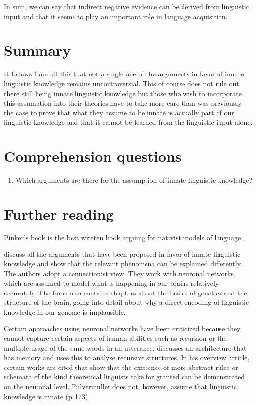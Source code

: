 In sum, we can say that indirect negative evidence can be derived from linguistic input and that it
seems to play an important role in language acquisition.
% 

\section{Summary}

It follows from all this that not a single one of the arguments in favor of innate linguistic knowledge remains uncontroversial.
This of course does not rule out there still being innate linguistic knowledge but those who wish to incorporate
this assumption into their theories have to take more care than was previously the case to prove that what they assume to be innate
is actually part of our linguistic knowledge and that it cannot be learned from the linguistic input alone.%
%


\section*{Comprehension questions}

\begin{enumerate}
\item Which arguments are there for the assumption of innate linguistic knowledge?
\end{enumerate} 


\section*{Further reading}

Pinker's book \citeyearpar{Pinker94a} is the best written book arguing for nativist models of language.

\citet*{EBJKSPP96a} discuss all the arguments that have been proposed in favor of innate linguistic knowledge and show
that the relevant phenomena can be explained differently. The authors adopt a connectionist view. They work with neuronal
networks, which are assumed to model what is happening in our brains relatively accurately.
The book also contains chapters about the basics of genetics and the structure of the brain, going into detail about why
a direct encoding of linguistic knowledge in our genome is implausible. 

Certain approaches using neuronal networks have been criticized because they cannot capture certain aspects of human abilities
such as recursion or the multiple usage of the same words in an utterance.
 \citet{Pulvermueller2010a} discusses an architecture that has memory and uses this to analyze recursive structures. In his overview article,
 certain works are cited that show that the existence of more abstract rules or schemata of the kind theoretical linguists take for granted
 can be demonstrated on the neuronal level. Pulvermüller does not, however, assume that linguistic knowledge is innate (p.\,173).


